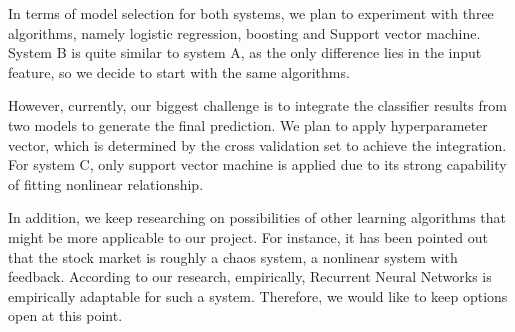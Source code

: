 \documentclass[letterpaper, 10 pt, conference]{ieeeconf}  %
\begin{document}

In terms of model selection for both systems, we plan to experiment with three algorithms, namely logistic regression, boosting and Support vector machine. System B is quite similar to system A, as the only difference lies in the input feature, so we decide to start with the same algorithms.


However, currently, our biggest challenge is to integrate the classifier results from two models to generate the final prediction. We plan to apply hyperparameter vector, which is determined by the cross validation set to achieve the integration. For system C, only support vector machine is applied due to its strong capability of fitting nonlinear relationship.

In addition, we keep researching on possibilities of other learning algorithms that might be more applicable to our project. For instance, it has been pointed out that the stock market is roughly a chaos system, a nonlinear system with feedback. According to our research, empirically, Recurrent Neural Networks is empirically adaptable for such a system. Therefore, we would like to keep options open at this point.
\end{document}
